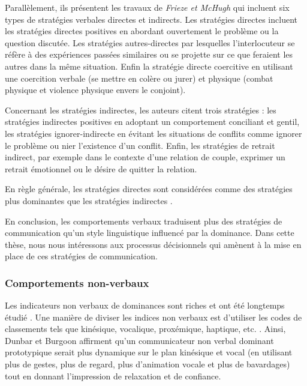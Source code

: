			Parallèlement, ils présentent les travaux de \emph{Frieze et McHugh} \cite{frieze1992power} qui incluent six types de stratégies verbales directes et indirects. 
			Les stratégies directes incluent les stratégies	directes positives en abordant ouvertement le problème ou la question discutée. Les stratégies autres-directes par lesquelles l'interlocuteur se réfère à des expériences passées similaires ou se projette sur ce que feraient les autres dans la même situation. Enfin la stratégie directe coercitive en utilisant une coercition verbale (se mettre en colère ou jurer) et physique (combat physique et violence physique envers le conjoint). 
			
			Concernant les stratégies indirectes, les auteurs citent trois stratégies : les stratégies indirectes positives en adoptant un comportement conciliant et gentil, les stratégies ignorer-indirecte en évitant les situations de conflits comme ignorer le problème ou nier l'existence d'un conflit. Enfin, les stratégies de retrait indirect, par exemple dans le contexte d'une relation de couple, exprimer un retrait émotionnel ou le désire de quitter la relation. 
		
			En règle générale, les stratégies directes sont considérées comme des stratégies plus dominantes que les stratégies indirectes \cite{dunbar2005perceptions}.
			
			En conclusion, les comportements verbaux traduisent plus des stratégies de communication qu'un style linguistique influencé par la dominance. Dans cette thèse, nous nous intéressons aux processus décisionnels qui amènent à la mise en place de ces stratégies de communication. 
			
		\subsubsection{Comportements non-verbaux}
			Les indicateurs non verbaux de dominances sont riches et ont été longtemps étudié \cite{burgoon1995interpersonal,burgoon1998nature}. Une manière de diviser les indices non verbaux est d'utiliser les codes de classements tels que kinésique, vocalique, proxémique, haptique, etc. \cite{burgoon2006nonverbal}. Ainsi, Dunbar et Burgoon \cite{dunbar2005perceptions} affirment qu'un communicateur non verbal dominant prototypique serait plus dynamique sur le plan kinésique et vocal (en utilisant plus de gestes, plus de regard, plus d'animation vocale et plus de bavardages) tout en donnant l'impression de relaxation et de confiance.
			
